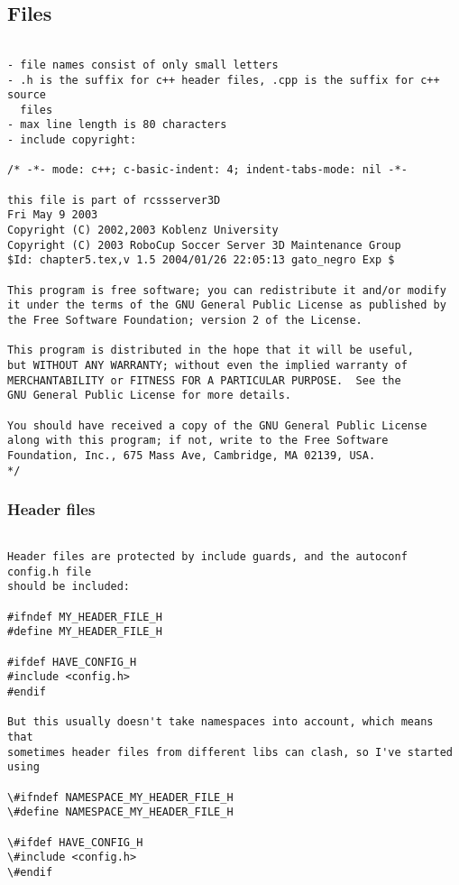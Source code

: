 \subsection{Files}
\begin{verbatim}

- file names consist of only small letters
- .h is the suffix for c++ header files, .cpp is the suffix for c++ source 
  files
- max line length is 80 characters
- include copyright:

/* -*- mode: c++; c-basic-indent: 4; indent-tabs-mode: nil -*-
   
this file is part of rcssserver3D
Fri May 9 2003
Copyright (C) 2002,2003 Koblenz University
Copyright (C) 2003 RoboCup Soccer Server 3D Maintenance Group
$Id: chapter5.tex,v 1.5 2004/01/26 22:05:13 gato_negro Exp $

This program is free software; you can redistribute it and/or modify
it under the terms of the GNU General Public License as published by
the Free Software Foundation; version 2 of the License.
  
This program is distributed in the hope that it will be useful,
but WITHOUT ANY WARRANTY; without even the implied warranty of
MERCHANTABILITY or FITNESS FOR A PARTICULAR PURPOSE.  See the
GNU General Public License for more details.
 
You should have received a copy of the GNU General Public License
along with this program; if not, write to the Free Software
Foundation, Inc., 675 Mass Ave, Cambridge, MA 02139, USA.
*/

\end{verbatim}
\subsubsection{Header files}
\begin{verbatim}

Header files are protected by include guards, and the autoconf config.h file
should be included:

#ifndef MY_HEADER_FILE_H
#define MY_HEADER_FILE_H

#ifdef HAVE_CONFIG_H
#include <config.h>
#endif

But this usually doesn't take namespaces into account, which means that 
sometimes header files from different libs can clash, so I've started using

\#ifndef NAMESPACE_MY_HEADER_FILE_H
\#define NAMESPACE_MY_HEADER_FILE_H

\#ifdef HAVE_CONFIG_H
\#include <config.h>
\#endif

\end{verbatim}

